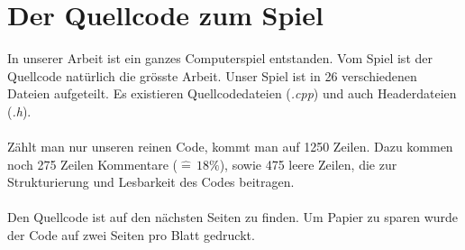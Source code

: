 \documentclass[11pt,a4paper]{scrbook}
\begin{document}
\chapter*{Der Quellcode zum Spiel}
In unserer Arbeit ist ein ganzes Computerspiel entstanden. Vom Spiel ist der Quellcode natürlich die grösste Arbeit.
Unser Spiel ist in 26 verschiedenen Dateien aufgeteilt. Es existieren Quellcodedateien (\textit{.cpp}) und auch Headerdateien (\textit{.h}).\\
\\
Zählt man nur unseren reinen Code, kommt man auf 1250 Zeilen. Dazu kommen noch 275
Zeilen Kommentare ($\widehat{=}\,18\%$), sowie 475 leere Zeilen, die zur Strukturierung und Lesbarkeit des Codes beitragen.\\
\\
Den Quellcode ist auf den nächsten Seiten zu finden. Um Papier zu sparen wurde der Code auf zwei Seiten pro Blatt
gedruckt.
\end{document}
